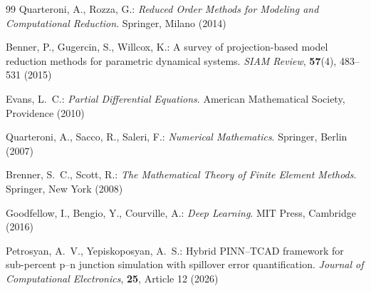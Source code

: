 \documentclass[preprint,12pt]{elsarticle}
\theoremstyle{definition}
\numberwithin{equation}{section}
\begin{document}
\begin{thebibliography}{99}
Quarteroni, A., Rozza, G.:
\textit{Reduced Order Methods for Modeling and Computational Reduction}.
Springer, Milano (2014)

Benner, P., Gugercin, S., Willcox, K.:
A survey of projection-based model reduction methods for parametric dynamical systems.
\textit{SIAM Review},
\textbf{57}(4), 483--531 (2015)

Evans, L.~C.:
\textit{Partial Differential Equations}.
American Mathematical Society, Providence (2010)

Quarteroni, A., Sacco, R., Saleri, F.:
\textit{Numerical Mathematics}.
Springer, Berlin (2007)

Brenner, S.~C., Scott, R.:
\textit{The Mathematical Theory of Finite Element Methods}.
Springer, New York (2008)

Goodfellow, I., Bengio, Y., Courville, A.:
\textit{Deep Learning}.
MIT Press, Cambridge (2016)

Petrosyan, A.~V., Yepiskoposyan, A.~S.:
Hybrid PINN--TCAD framework for sub-percent p--n junction simulation with spillover error quantification.
\textit{Journal of Computational Electronics},
\textbf{25}, Article 12 (2026)

\end{thebibliography}
\end{document}
